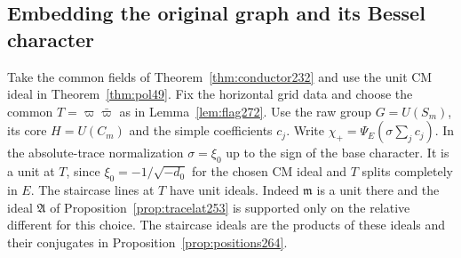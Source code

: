 \documentclass[a4paper,11pt]{article}
\theoremstyle{definition}
\theoremstyle{remark}
\numberwithin{equation}{section}
\begin{document}
\subsection{Embedding the original graph and its Bessel character}\label{nav:VI-46}
Take the common fields of Theorem~\ref{thm:conductor232} and
use the unit CM ideal in Theorem~\ref{thm:pol49}. Fix the
horizontal grid data and choose the common \(T=\varpi\bar\varpi\)
as in Lemma~\ref{lem:flag272}. Use the raw group \(G=U(S_m)\),
its core \(H=U(C_m)\) and the simple coefficients \(c_j\).
Write \(\chi_+=\Psi_E(\sigma\sum_jc_j)\). In the absolute-trace
normalization \(\sigma=\xi_0\) up to the sign of the base
character. It is a unit at \(T\), since
\(\xi_0=-1/\sqrt{-d_0}\) for the chosen CM ideal and \(T\)
splits completely in \(E\). The staircase lines at \(T\) have
unit ideals. Indeed \(\mathfrak m\) is a unit there and the
ideal \(\mathfrak A\) of Proposition~\ref{prop:tracelat253}
is supported only on the relative different for this choice.
The staircase ideals are the products of these ideals and
their conjugates in Proposition~\ref{prop:positions264}.
\end{document}
